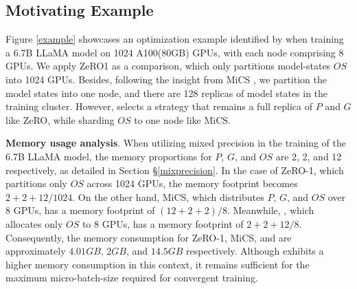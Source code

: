 \subsection{Motivating Example} 
Figure \ref{example} showcases an optimization example identified by \SysName when training a 6.7B LLaMA model on 1024 A100(80GB) GPUs, with each node comprising 8 GPUs. We apply ZeRO1 as a comparison, which only partitions model-states $OS$ into 1024 GPUs. Besides, following the insight from MiCS \cite{MiCS}, we partition the model states into one node, and there are 128 replicas of model states in the training cluster. However, \SysName selects a strategy that remains a full replica of $P$ and $G$ like ZeRO, while sharding $OS$ to one node like MiCS.


\noindent\textbf{Memory usage analysis}. When utilizing mixed precision in the training of the 6.7B LLaMA model, the memory proportions for $P$, $G$, and $OS$ are 2, 2, and 12 respectively, as detailed in Section \S\ref{mixprecision}. In the case of ZeRO-1, which partitions only $OS$ across 1024 GPUs, the memory footprint becomes $2+2+12/1024$. On the other hand, MiCS, which distributes $P$, $G$, and $OS$ over 8 GPUs, has a memory footprint of $(12+2+2)/8$. Meanwhile, \SysName, which allocates only $OS$ to 8 GPUs, has a memory footprint of $2+2+12/8$. Consequently, the memory consumption for ZeRO-1, MiCS, and \SysName are approximately $4.01GB$, $2GB$, and $14.5GB$ respectively. Although \SysName exhibits a higher memory consumption in this context, 
it remains sufficient for the maximum micro-batch-size required for convergent training.



